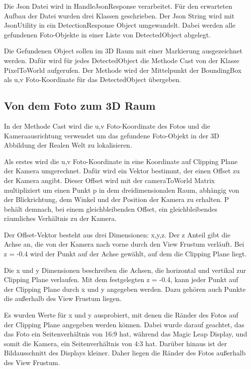 \documentclass[german,a4paper, 12pt]{llncs}
\begin{document}
Die Json Datei wird in HandleJsonResponse verarbeitet. Für den erwarteten Aufbau der Datei wurden drei Klassen geschrieben. Der Json String wird mit JsonUtility in ein DetectionResponse Object umgewandelt. Dabei werden alle gefundenen Foto-Objekte in einer Liste von DetectedObject abgelegt. %

Die Gefundenen Object sollen im 3D Raum mit einer Markierung ausgezeichnet werden. 
Dafür wird für jedes DetectedObject die Methode Cast von der Klasse PixelToWorld aufgerufen. Der Methode wird der Mittelpunkt der BoundingBox als u,v Foto-Koordinate für das DetectedObject übergeben.

\subsection{Von dem Foto zum 3D Raum}

In der Methode Cast wird die u,v Foto-Koordinate des Fotos und die Kameraausrichtung verwendet um das gefundene Foto-Objekt in der 3D Abbildung der Realen Welt zu lokalisieren.

Als erstes wird die u,v Foto-Koordinate in eine Koordinate auf Clipping Plane der Kamera umgerechnet. 
Dafür wird ein Vektor bestimmt, der einen Offset zu der Kamera angibt. 
Dieser Offset wird mit der cameraToWorld Matrix multipliziert um einen Punkt p in dem dreidimensionalen Raum, abhängig von der Blickrichtung, dem Winkel und der Position der Kamera zu erhalten. P behält demnach, bei einem gleichbleibenden Offset, ein gleichbleibendes räumliches Verhältnis zu der Kamera.

Der Offset-Vektor besteht aus drei Dimensionen: x,y,z.
Der z Anteil gibt die Achse an, die von der Kamera nach vorne durch den View Frustum verläuft. Bei z = -0.4 wird der Punkt auf der Achse gewählt, auf dem die Clipping Plane liegt. 

Die x und y Dimensionen beschreiben die Achsen, die horizontal und vertikal zur Clipping Plane verlaufen. Mit dem festgelegten z = -0.4, kann jeder Punkt auf der Clipping Plane durch x und y angegeben werden. Dazu gehören auch Punkte die außerhalb des View Frustum liegen.

Es wurden Werte für x und y ausprobiert, mit denen die Ränder des Fotos auf der Clipping Plane angegeben werden können. Dabei wurde darauf geachtet, das das Foto ein Seitenverhältnis von 16:9 hat, während das Magic Leap Display, und somit die Kamera, ein Seitenverhältnis von 4:3 hat. Darüber hinaus ist der Bildausschnitt des Displays kleiner. Daher liegen die Ränder des Fotos außerhalb des View Frustum. 
\end{document}
